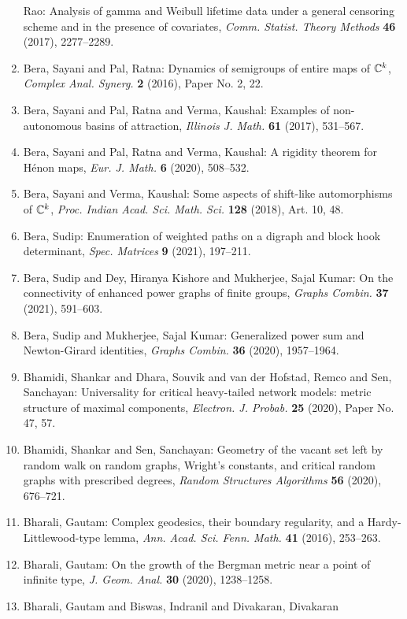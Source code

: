 \begin{enumerate}
Rao: Analysis of gamma and {W}eibull lifetime data under a general
censoring scheme and in the presence of covariates, \emph{Comm. Statist. Theory Methods} {\bf 46} (2017), 2277--2289.
\item Bera, Sayani and Pal, Ratna: Dynamics of semigroups of entire maps of {$\Bbb{C}^k$}, \emph{Complex Anal. Synerg.} {\bf 2} (2016), Paper No. 2, 22.
\item Bera, Sayani and Pal, Ratna and Verma, Kaushal: Examples of non-autonomous basins of attraction, \emph{Illinois J. Math.} {\bf 61} (2017), 531--567.
\item Bera, Sayani and Pal, Ratna and Verma, Kaushal: A rigidity theorem for {H}\'{e}non maps, \emph{Eur. J. Math.} {\bf 6} (2020), 508--532.
\item Bera, Sayani and Verma, Kaushal: Some aspects of shift-like automorphisms of {$\Bbb C^k$}, \emph{Proc. Indian Acad. Sci. Math. Sci.} {\bf 128} (2018), Art. 10, 48.
\item Bera, Sudip: Enumeration of weighted paths on a digraph and block hook
determinant, \emph{Spec. Matrices} {\bf 9} (2021), 197--211.
\item Bera, Sudip and Dey, Hiranya Kishore and Mukherjee, Sajal
Kumar: On the connectivity of enhanced power graphs of finite groups, \emph{Graphs Combin.} {\bf 37} (2021), 591--603.
\item Bera, Sudip and Mukherjee, Sajal Kumar: Generalized power sum and {N}ewton-{G}irard identities, \emph{Graphs Combin.} {\bf 36} (2020), 1957--1964.
\item Bhamidi, Shankar and Dhara, Souvik and van der Hofstad, Remco
and Sen, Sanchayan: Universality for critical heavy-tailed network models: metric
structure of maximal components, \emph{Electron. J. Probab.} {\bf 25} (2020), Paper No. 47, 57.
\item Bhamidi, Shankar and Sen, Sanchayan: Geometry of the vacant set left by random walk on random
graphs, {W}right's constants, and critical random graphs with
prescribed degrees, \emph{Random Structures Algorithms} {\bf 56} (2020), 676--721.
\item Bharali, Gautam: Complex geodesics, their boundary regularity, and a
{H}ardy-{L}ittlewood-type lemma, \emph{Ann. Acad. Sci. Fenn. Math.} {\bf 41} (2016), 253--263.
\item Bharali, Gautam: On the growth of the {B}ergman metric near a point of infinite
type, \emph{J. Geom. Anal.} {\bf 30} (2020), 1238--1258.
\item Bharali, Gautam and Biswas, Indranil and Divakaran, Divakaran

\end{enumerate}
